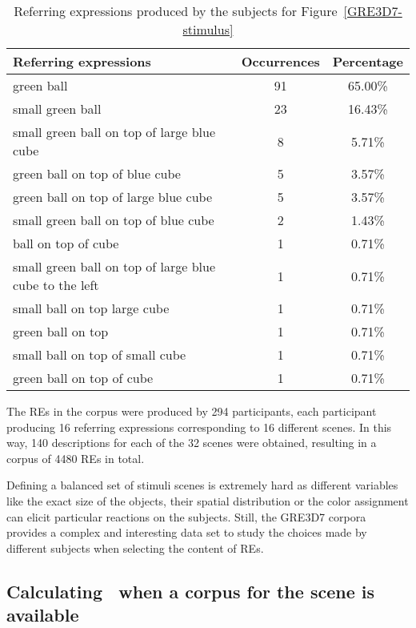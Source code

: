 \begin{table}[h!]
\begin{center}
\begin{tabular}{|l|c|c|}
\hline
Referring expressions & Occurrences & Percentage \\
\hline
green ball & 91 & 65.00\% \\
small green ball & 23 & 16.43\% \\
small green ball on top of large blue cube & 8 & 5.71\% \\
green ball on top of blue cube & 5 & 3.57\% \\
green ball on top of large blue cube & 5 & 3.57\% \\
small green ball on top of blue cube & 2 & 1.43\% \\
ball on top of cube & 1 & 0.71\% \\
small green ball on top of large blue cube to the left & 1 & 0.71\% \\
small ball on top large cube & 1 & 0.71\% \\
green ball on top & 1 & 0.71\% \\
small ball on top of small cube & 1 & 0.71\% \\
green ball on top of cube & 1 & 0.71\% \\
\hline
\end{tabular}
\caption{Referring expressions produced by the subjects for Figure~\ref{GRE3D7-stimulus}\label{corpus-distribution}}
\end{center}
\end{table}

The REs in the corpus were produced by 294 participants, each participant producing 16 referring expressions corresponding to 16 different scenes. In this way, 140 descriptions for each of the 32 scenes were obtained, resulting in a corpus of 4480 REs in total. 

Defining a balanced set of stimuli scenes is extremely hard as different variables like the exact size of the objects, their spatial distribution or the color assignment can elicit particular reactions on the subjects.  Still, the GRE3D7 corpora provides a complex and interesting data set to study the choices made by different subjects when selecting the content of REs. 


\subsection{Calculating \puse\ when a corpus for the scene is available}

